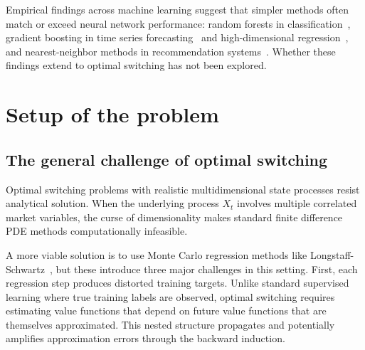 \documentclass[11pt,reqno,a4paper]{amsart}
\theoremstyle{definition}
\numberwithin{equation}{section}
\DeclareMathOperator{\1}{\mathbbm{1}}
\begin{document}


Empirical findings across machine learning suggest that simpler methods often match or exceed neural network performance: random forests in classification~\cite{fernandez2014we}, gradient boosting in time series forecasting~\cite{elsayed2021we} and high-dimensional regression~\cite{sheridan2016extreme}, and nearest-neighbor methods in recommendation systems~\cite{ferrari2019we}. Whether these findings extend to optimal switching has not been explored.

\section{Setup of the problem} \label{sec:setup}
\subsection{The general challenge of optimal switching}\label{sec:challenge}
Optimal switching problems with realistic multidimensional state processes resist analytical solution. When the underlying process $X_t$ involves multiple correlated market variables, the curse of dimensionality makes standard finite difference PDE methods computationally infeasible.

A more viable solution is to use Monte Carlo regression methods like Longstaff-Schwartz~\cite{LS01}, but these introduce three major challenges in this setting. First, each regression step produces distorted training targets. Unlike standard supervised learning where true training labels are observed, optimal switching requires estimating value functions that depend on future value functions that are themselves approximated. This nested structure propagates and potentially amplifies approximation errors through the backward induction.
\end{document}
